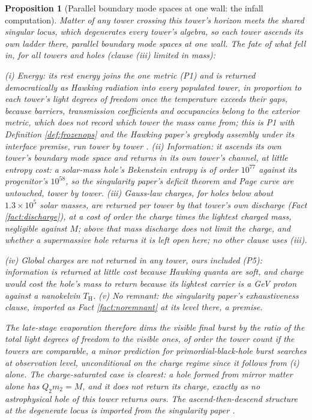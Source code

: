 \documentclass[11pt]{article}
\newtheorem{proposition}[theorem]{Proposition}
\theoremstyle{definition}
\begin{document}
\begin{proposition}[Parallel boundary mode spaces at one wall: the infall computation]\label{prop:infall}
Matter of any tower crossing this tower's horizon meets the shared singular locus, which degenerates every tower's algebra, so each tower ascends its own ladder there, parallel boundary mode spaces at one wall. The fate of what fell in, for all towers and holes (clause (iii) limited in mass):

(i) \emph{Energy:} its rest energy joins the one metric (P1) and is returned democratically as Hawking radiation into every populated tower, in proportion to each tower's light degrees of freedom once the temperature exceeds their gaps, because barriers, transmission coefficients and occupancies belong to the exterior metric, which does not record which tower the mass came from; this is P1 with Definition \ref{def:frozenops} and the Hawking paper's greybody assembly under its interface premise, run tower by tower \cite[Assembly~5.4]{ButlerT7}. (ii) \emph{Information:} it ascends its own tower's boundary mode space and returns in its own tower's channel, at little entropy cost: a solar-mass hole's Bekenstein entropy is of order $10^{77}$ against its progenitor's $10^{58}$, so the singularity paper's deficit theorem and Page curve are untouched, tower by tower. (iii) \emph{Gauss-law charges,} for holes below about $1.3 \times 10^{5}$ solar masses, are returned per tower by that tower's own discharge (Fact \ref{fact:discharge}), at a cost of order the charge times the lightest charged mass, negligible against $M$; above that mass discharge does not limit the charge, and whether a supermassive hole returns it is left open here; no other clause uses (iii).

(iv) \emph{Global charges} are not returned in any tower, ours included (P5): information is returned at little cost because Hawking quanta are soft, and charge would cost the hole's mass to return because its lightest carrier is a GeV proton against a nanokelvin $T_{\mathrm{H}}$. (v) \emph{No remnant:} the singularity paper's exhaustiveness clause, imported as Fact \ref{fact:noremnant} at its level there, a premise.

The late-stage evaporation therefore dims the visible final burst by the ratio of the total light degrees of freedom to the visible ones, of order the tower count if the towers are comparable, a minor prediction for primordial-black-hole burst searches at observation level, unconditional on the charge regime since it follows from (i) alone. The charge-saturated case is clearest: a hole formed from mirror matter alone has $Q_{2}m_{2} = M$, and it does not return its charge, exactly as no astrophysical hole of this tower returns ours. The ascend-then-descend structure at the degenerate locus is imported from the singularity paper \cite{ButlerT5}.
\end{proposition}
\end{document}
